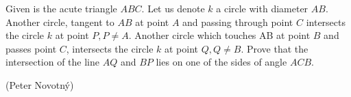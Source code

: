 Given is the acute triangle $ABC$. Let us denote $k$ a circle with diameter $AB$. Another circle, tangent to $AB$ at point $A$ and passing through point $C$ intersects the circle $k$ at point $P, P \ne A$. Another  circle which touches AB at point $B$ and passes point $C$, intersects the circle $k$ at point $Q, Q \ne B$. Prove that the intersection of the line $AQ$ and $BP$ lies on one of the sides of angle $ACB$.

(Peter Novotný)